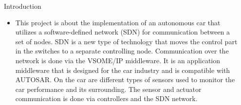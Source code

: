 \documentclass[final,hyperref={pdfpagelabels=false}]{beamer}
\begin{document}
\begin{frame}[t] %

\begin{columns}[t] %

\begin{column}{.02\textwidth}\end{column} %

\begin{column}{.465\textwidth} %


            
\begin{block}{Introduction}

\begin{itemize}
\item This project is about the implementation of an autonomous car that utilizes a software-defined network (SDN) for communication between a set of nodes. SDN is a new type of technology that moves the control part in the switches to a separate controlling node. Communication over the network is done via the VSOME/IP middleware. It is an application middleware that is designed for the car industry and is compatible with AUTOSAR. On the car are different types of sensors used to monitor the car performance and its surrounding. The sensor and actuator communication is done via controllers and the SDN network. 
\end{itemize}


\end{block}
\end{column}
\end{columns}
\end{frame}
\end{document}
